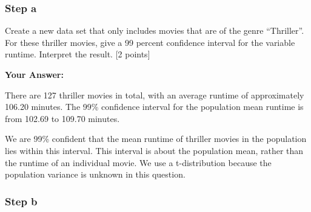 \documentclass[
]{article}
\newenvironment{Shaded}{\begin{snugshade}}{\end{snugshade}}
\newcommand{\AttributeTok}[1]{\textcolor[rgb]{0.13,0.29,0.53}{#1}}
\newcommand{\CommentTok}[1]{\textcolor[rgb]{0.56,0.35,0.01}{\textit{#1}}}
\newcommand{\DocumentationTok}[1]{\textcolor[rgb]{0.56,0.35,0.01}{\textbf{\textit{#1}}}}
\newcommand{\FloatTok}[1]{\textcolor[rgb]{0.00,0.00,0.81}{#1}}
\newcommand{\FunctionTok}[1]{\textcolor[rgb]{0.13,0.29,0.53}{\textbf{#1}}}
\newcommand{\NormalTok}[1]{#1}
\newcommand{\OtherTok}[1]{\textcolor[rgb]{0.56,0.35,0.01}{#1}}
\newcommand{\SpecialCharTok}[1]{\textcolor[rgb]{0.81,0.36,0.00}{\textbf{#1}}}
\newcommand{\StringTok}[1]{\textcolor[rgb]{0.31,0.60,0.02}{#1}}
\begin{document}
\subsubsection{Step a}\label{step-a-3}

Create a new data set that only includes movies that are of the genre
``Thriller''. For these thriller movies, give a 99 percent confidence
interval for the variable runtime. Interpret the result. {[}2 points{]}

\begin{Shaded}
\end{Shaded}

\textbf{Your Answer:}

There are 127 thriller movies in total, with an average runtime of
approximately 106.20 minutes. The 99\% confidence interval for the
population mean runtime is from 102.69 to 109.70 minutes.

We are 99\% confident that the mean runtime of thriller movies in the
population lies within this interval. This interval is about the
population mean, rather than the runtime of an individual movie. We use
a t-distribution because the population variance is unknown in this
question.

\subsubsection{Step b}\label{step-b-3}
\end{document}
